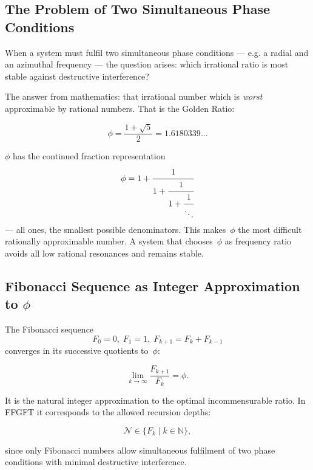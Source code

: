 \subsection{The Problem of Two Simultaneous Phase Conditions}

When a system must fulfil two simultaneous phase conditions —
e.g. a radial and an azimuthal frequency — the question arises:
which irrational ratio is most stable against destructive
interference?

The answer from mathematics: that irrational number which is
\emph{worst} approximable by rational numbers.
That is the Golden Ratio:

\begin{equation}
  \phi = \frac{1 + \sqrt{5}}{2} = 1.6180339\ldots
\end{equation}

\begin{keybox}
$\phi$ has the continued fraction representation
\[
  \phi = 1 + \cfrac{1}{1 + \cfrac{1}{1 + \cfrac{1}{\ddots}}}
\]
— all ones, the smallest possible denominators. This makes~$\phi$
the most difficult rationally approximable number. A system that
chooses~$\phi$ as frequency ratio avoids all low rational resonances
and remains stable.
\end{keybox}

\subsection{Fibonacci Sequence as Integer Approximation to $\phi$}

The Fibonacci sequence
\begin{equation}
  F_0 = 0,\; F_1 = 1,\; F_{k+1} = F_k + F_{k-1}
\end{equation}
converges in its successive quotients to~$\phi$:

\begin{equation}
  \lim_{k \to \infty} \frac{F_{k+1}}{F_k} = \phi.
\end{equation}

It is the natural integer approximation to the optimal
incommensurable ratio. In FFGFT it corresponds to the allowed
recursion depths:

\begin{equation}
  \mathcal{N} \in \{F_k \mid k \in \mathbb{N}\},
\end{equation}

since only Fibonacci numbers allow simultaneous fulfilment of two
phase conditions with minimal destructive interference.

